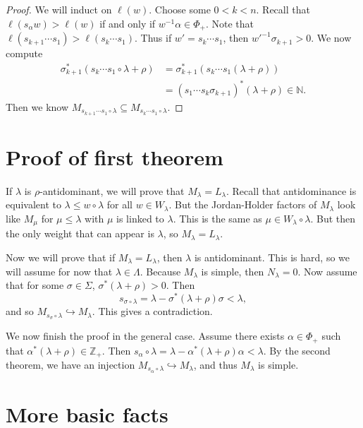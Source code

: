 \documentclass[leqno, openany]{memoir}
\theoremstyle{definition}
\theoremstyle{remark}
\theoremstyle{plain}
\theoremstyle{definition}
\theoremstyle{remark}
\newcommand{\N}{\mathbb{N}}
\newcommand{\Z}{\mathbb{Z}}
\begin{document}
\begin{proof}
    We will induct on $\ell(w)$. Choose some $0 < k < n$. Recall that $\ell(s_{\alpha} w) > \ell(w)$ if and only if $w^{-1} \alpha \in \Phi_+$. Note that $\ell(s_{k+1} \cdots s_1) > \ell(s_k \cdots s_1)$. Thus if $w' = s_k \cdots s_1$, then ${w'}^{-1} \sigma_{k+1} > 0$. We now compute
    \begin{align*}
        \sigma_{k+1}^* (s_k \cdots s_1 \circ \lambda + \rho) &= \sigma_{k+1}^* (s_k \cdots s_1 (\lambda + \rho)) \\
        &= (s_1 \cdots s_k \sigma_{k+1})^* (\lambda + \rho) \in \N.
    \end{align*}
    Then we know $M_{s_{k+1} \cdots s_1 \circ \lambda} \subseteq M_{s_k \cdots s_1 \circ \lambda}$.
\end{proof}

\section{Proof of first theorem}%
\label{sec:proof_of_first_theorem}

If $\lambda$ is $\rho$-antidominant, we will prove that $M_{\lambda} = L_{\lambda}$. Recall that antidominance is equivalent to $\lambda \leq w \circ \lambda$ for all $w \in W_{\lambda}$. But the Jordan-Holder factors of $M_{\lambda}$ look like $M_{\mu}$ for $\mu \leq \lambda$ with $\mu$ is linked to $\lambda$. This is the same as $\mu \in W_{\lambda} \circ \lambda$. But then the only weight that can appear is $\lambda$, so $M_{\lambda} = L_{\lambda}$.

Now we will prove that if $M_{\lambda} = L_{\lambda}$, then $\lambda$ is antidominant. This is hard, so we will assume for now that $\lambda \in \Lambda$. Because $M_{\lambda}$ is simple, then $N_{\lambda} = 0$. Now assume that for some $\sigma \in \Sigma$, $\sigma^* (\lambda + \rho) > 0$. Then
\[ s_{\sigma \circ \lambda} = \lambda - \sigma^* (\lambda + \rho) \sigma < \lambda, \]
and so $M_{s_{\sigma} \circ \lambda} \hookrightarrow M_{\lambda}$. This gives a contradiction.

We now finish the proof in the general case. Assume there exists $\alpha \in \Phi_+$ such that $\alpha^*(\lambda + \rho) \in \Z_+$. Then $s_{\alpha} \circ \lambda = \lambda - \alpha^*(\lambda + \rho) \alpha < \lambda$. By the second theorem, we have an injection $M_{s_{\alpha} \circ \lambda} \hookrightarrow M_{\lambda}$, and thus $M_{\lambda}$ is simple.

\section{More basic facts}%
\label{sec:more_basic_facts}
\end{document}
